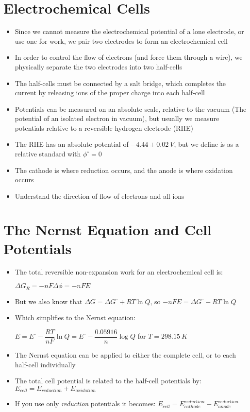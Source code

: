 \documentclass[12pt, openany, letterpaper]{memoir}
\begin{document}
\section*{Electrochemical Cells}
\begin{itemize}
	\item Since we cannot measure the electrochemical potential of a lone electrode, or use one for work, we pair two electrodes to form an electrochemical cell
	\item In order to control the flow of electrons (and force them through a wire), we physically separate the two electrodes into two half-cells
	\item The half-cells must be connected by a salt bridge, which completes the current by releasing ions of the proper charge into each half-cell
	\item Potentials can be measured on an absolute scale, relative to the vacuum (The potential of an isolated electron in vacuum), but usually we measure potentials relative to a reversible hydrogen electrode (RHE)
	\item The RHE has an absolute potential of $-4.44\pm0.02~V$, but we define is as a relative standard with $\phi^\circ=0$
	\item The cathode is where reduction occurs, and the anode is where oxidation occurs
	\item Understand the direction of flow of electrons and all ions
\end{itemize}
\section*{The Nernst Equation and Cell Potentials}
\begin{itemize}
	\item The total reversible non-expansion work for an electrochemical cell is:
	
	$\Delta G_R = -nF\Delta\phi = -nFE$
	\item But we also know that $\Delta G=\Delta G^\circ+RT\ln Q$, so $-nFE=\Delta G^\circ + RT\ln Q$
	\item Which simplifies to the Nernst equation:
	
	$E=E^\circ-\dfrac{RT}{nF}\ln Q = E^\circ - \dfrac{0.05916}{n}\log Q$ for $T=298.15~K$
	\item The Nernst equation can be applied to either the complete cell, or to each half-cell individually
	\item The total cell potential is related to the half-cell potentials by: $E_{cell} = E_{reduction} + E_{oxidation}$
	\item If you use only \emph{reduction} potentials it becomes: $E_{cell} = E^{reduction}_{cathode}-E^{reduction}_{anode}$
\end{itemize}
\end{document}
